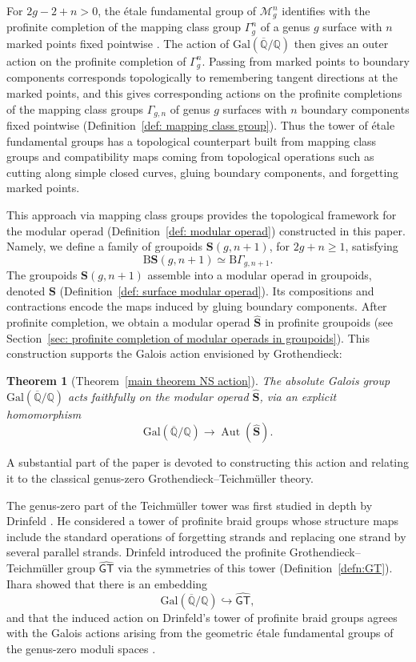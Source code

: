 \documentclass{amsart}
\newcommand{\bS}{\mathbf{S}}
\newcommand{\galQ}{\mathbf{\mathrm{Gal}}(\overline{\mathbb{Q}}/\mathbb{Q})}
\newcommand{\cs}{\mathrm{B}}
\newcommand{\GT}{\widehat{\mathsf{GT}}}
\newtheorem*{thm*}{Theorem}
\theoremstyle{definition}
\numberwithin{equation}{section}
\begin{document}
For $2g-2+n>0$, the \'etale fundamental group of $\mathcal M_g^n$ identifies with the profinite completion of the mapping class group $\Gamma_g^n$ of a genus $g$ surface with $n$ marked points fixed pointwise \cite{matsumoto2000arithmetic,boggi2009fundamental}. The action of $\galQ$ then gives an outer action on the profinite completion of $\Gamma_g^n$. Passing from marked points to boundary components corresponds topologically to remembering tangent directions at the marked points, and this gives corresponding actions on the profinite completions of the mapping class groups $\Gamma_{g,n}$ of genus $g$ surfaces with $n$ boundary components fixed pointwise (Definition~\ref{def: mapping class group}). Thus the tower of \'etale fundamental groups has a topological counterpart built from mapping class groups and compatibility maps coming from topological operations such as cutting along simple closed curves, gluing boundary components, and forgetting marked points. 

This approach via mapping class groups provides the topological framework for the modular operad (Definition~\ref{def: modular operad}) constructed in this paper. Namely, we define a family of groupoids $\bS(g,n+1)$, for $2g+n\geq 1$, satisfying
    \[\cs\mathbf S(g,n+1)\simeq \cs\Gamma_{g,n+1}.\]
The groupoids $\mathbf S(g,n+1)$ assemble into a modular operad in groupoids, denoted $\mathbf S$ (Definition~\ref{def: surface modular operad}).  Its compositions and contractions encode the maps induced by gluing boundary components. After profinite completion, we obtain a modular operad $\widehat{\bS}$ in profinite groupoids (see Section~\ref{sec: profinite completion of modular operads in groupoids}). This construction supports the Galois action envisioned by Grothendieck:

\begin{thm*}[Theorem~\ref{main theorem NS action}]
The absolute Galois group $\galQ$ acts faithfully on the modular operad
$\widehat{\mathbf S}$, via an explicit homomorphism
\[
\galQ\longrightarrow \operatorname{Aut}(\widehat{\mathbf S}).
\]
\end{thm*}

A substantial part of the paper is devoted to constructing this action and relating it to the classical genus-zero Grothendieck--Teichm\"uller theory.

The genus-zero part of the Teichm\"uller tower was first studied in depth by Drinfeld \cite[Section~4]{Drin}. He considered a tower of profinite braid groups whose structure maps include the standard operations of forgetting strands and replacing one strand by several parallel strands. Drinfeld introduced the profinite Grothendieck--Teichm\"uller group $\GT$ via the symmetries of this tower (Definition~\ref{defn:GT}). Ihara showed that there is an embedding
    \[\galQ\hookrightarrow \GT,\]
and that the induced action on Drinfeld's tower of profinite braid groups agrees with the Galois actions arising from the geometric \'etale fundamental groups
of the genus-zero moduli spaces \cite{ihara}. 
\end{document}
